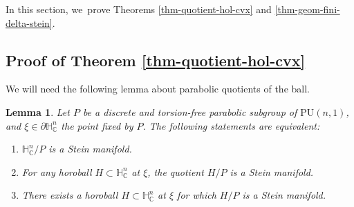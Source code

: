 \documentclass[JEP,XML,SOM,Unicode,NoEqCountersInSection,published]{cedram}
\newtheorem{lemma}[theorem]{Lemma}
\theoremstyle{definition}
\newcommand{\C}{\mathbb{C}}
\newcommand{\HNC}{\mathbb{H}^{n}_{\C}}
\newcommand{\PHNC}{\partial\mathbb{H}^{n}_{\C}}
\newcommand{\PU}{\mathrm{PU}}
\def\C{\mathbb{C}}
\newcommand{\HNC}{\mathbb{H}^{n}_{\C}}
\newcommand{\PU}{\mathrm{PU}}
\begin{document}
In this section, we~prove Theorems \ref{thm-quotient-hol-cvx} and \ref{thm-geom-fini-delta-stein}.

\subsection{Proof of Theorem \ref{thm-quotient-hol-cvx}}

We will need the following lemma about parabolic quotients of the ball.

\begin{lemma}\label{lem-quotient-horoboule-stein}
Let $P$ be a discrete and torsion-free parabolic subgroup of $\PU(n,1)$, and $\xi\in \PHNC$ the point fixed by $P$. The following statements are equivalent:
\begin{enumerate}
\item\label{lem-quotient-horoboule-stein1} $\HNC/P$ is a Stein manifold.
\item\label{lem-quotient-horoboule-stein2} For any horoball $H\subset \HNC$ at $\xi$, the quotient $H/P$ is a Stein manifold.
\item\label{lem-quotient-horoboule-stein3} There exists a horoball $H\subset \HNC$ at $\xi$ for which $H/P$ is a Stein manifold.
\end{enumerate}
\end{lemma}
\end{document}
